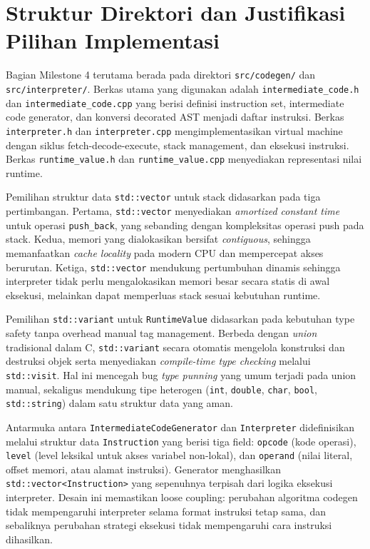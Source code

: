 \section{Struktur Direktori dan Justifikasi Pilihan Implementasi}
Bagian Milestone 4 terutama berada pada direktori \texttt{src/codegen/} dan \texttt{src/interpreter/}. Berkas utama yang digunakan adalah \texttt{intermediate\_code.h} dan \texttt{intermediate\_code.cpp} yang berisi definisi instruction set, intermediate code generator, dan konversi decorated AST menjadi daftar instruksi. Berkas \texttt{interpreter.h} dan \texttt{interpreter.cpp} mengimplementasikan virtual machine dengan siklus fetch-decode-execute, stack management, dan eksekusi instruksi. Berkas \texttt{runtime\_value.h} dan \texttt{runtime\_value.cpp} menyediakan representasi nilai runtime.

Pemilihan struktur data \texttt{std::vector} untuk stack didasarkan pada tiga pertimbangan. Pertama, \texttt{std::vector} menyediakan \textit{amortized constant time} untuk operasi \texttt{push\_back}, yang sebanding dengan kompleksitas operasi push pada stack. Kedua, memori yang dialokasikan bersifat \textit{contiguous}, sehingga memanfaatkan \textit{cache locality} pada modern CPU dan mempercepat akses berurutan. Ketiga, \texttt{std::vector} mendukung pertumbuhan dinamis sehingga interpreter tidak perlu mengalokasikan memori besar secara statis di awal eksekusi, melainkan dapat memperluas stack sesuai kebutuhan runtime.

Pemilihan \texttt{std::variant} untuk \texttt{RuntimeValue} didasarkan pada kebutuhan type safety tanpa overhead manual tag management. Berbeda dengan \textit{union} tradisional dalam C, \texttt{std::variant} secara otomatis mengelola konstruksi dan destruksi objek serta menyediakan \textit{compile-time type checking} melalui \texttt{std::visit}. Hal ini mencegah bug \textit{type punning} yang umum terjadi pada union manual, sekaligus mendukung tipe heterogen (\texttt{int}, \texttt{double}, \texttt{char}, \texttt{bool}, \texttt{std::string}) dalam satu struktur data yang aman.

Antarmuka antara \texttt{IntermediateCodeGenerator} dan \texttt{Interpreter} didefinisikan melalui struktur data \texttt{Instruction} yang berisi tiga field: \texttt{opcode} (kode operasi), \texttt{level} (level leksikal untuk akses variabel non-lokal), dan \texttt{operand} (nilai literal, offset memori, atau alamat instruksi). Generator menghasilkan \texttt{std::vector<Instruction>} yang sepenuhnya terpisah dari logika eksekusi interpreter. Desain ini memastikan loose coupling: perubahan algoritma codegen tidak mempengaruhi interpreter selama format instruksi tetap sama, dan sebaliknya perubahan strategi eksekusi tidak mempengaruhi cara instruksi dihasilkan.

